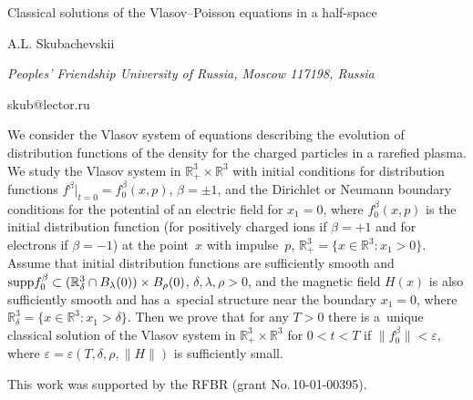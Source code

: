 \documentclass[10pt,a4paper]{article}
\def\R{\mathbb{R}}
\begin{document}
\begin{center}

{\Large Classical solutions of the Vlasov--Poisson equations in a half-space}

\bigskip

{\sc A.L. Skubachevskii}

{\small\it Peoples' Friendship University of Russia, Moscow 117198, Russia}

{\small\rm skub@lector.ru}

\end{center}

\bigskip

We consider the Vlasov system of equations describing the evolution
of distribution functions of the density for the charged particles
in a rarefied plasma. We study the Vlasov system in
$\R_+^3\times\R^3$ with initial conditions for distribution
functions $f^\beta\big|_{t=0}=f_0^\beta(x,p)$, $\beta=\pm1$, and the
Dirichlet or Neumann boundary conditions for the potential of an
electric field for $x_1=0$, where $f_0^\beta(x,p)$ is the initial
distribution function (for positively charged ions if $\beta=+1$ and
for electrons if $\beta=-1$) at the point~$x$ with impulse~$p$,
$\R_+^3=\{x\in\R^3\colon x_1>0\}$. Assume that initial distribution
functions are sufficiently smooth and ${\rm supp}
f_0^\beta\subset(\R_\delta^3 \cap B_\lambda(0))\times B_\rho(0)$,
$\delta,\lambda,\rho>0$, and the magnetic field $H(x)$ is also
sufficiently smooth and has a~special structure near the boundary
$x_1=0$, where $\R_\delta^3=\{x\in\R^3\colon x_1>\delta\}$. Then we
prove that for any $T>0$ there is a~unique classical solution of the
Vlasov system in $\R_+^3\times\R^3$ for $0<t<T$ if
$\|f_0^\beta\|<\varepsilon$, where
$\varepsilon=\varepsilon(T,\delta,\rho,\|H\|)$ is sufficiently
small.

This work was supported by the RFBR (grant No.\,10-01-00395).
\end{document}
